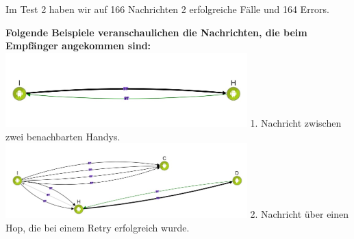 Im Test 2 haben wir auf 166 Nachrichten 2 erfolgreiche Fälle und 164
Errors.

\textbf{Folgende Beispiele veranschaulichen die Nachrichten, die beim
Empfänger angekommen sind:}
\includegraphics[width=0.7\textwidth]{belege/grosstests/Bilder/Test2Erfolg1.jpg} 1. Nachricht
zwischen zwei benachbarten Handys.
\includegraphics[width=0.7\textwidth]{belege/grosstests/Bilder/Test2Erfolg2.jpg} 2. Nachricht
über einen Hop, die bei einem Retry erfolgreich wurde.

